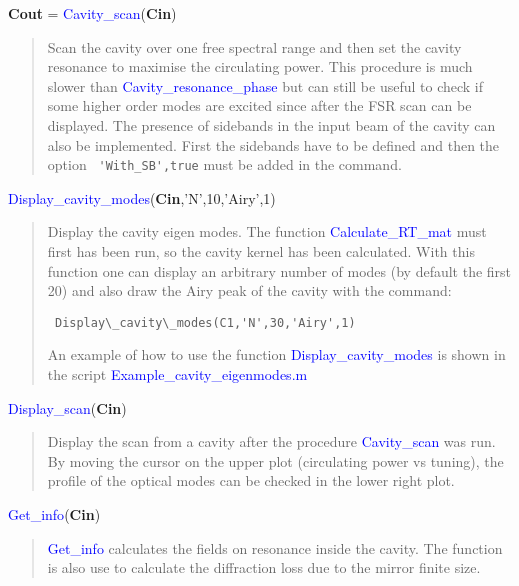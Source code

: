\noindent \textbf{Cout} = \textcolor{blue}{Cavity\_scan}(\textbf{Cin})
\vspace*{-0.2cm}
\begin{quote}
Scan the cavity over one free spectral range and then set the cavity resonance to maximise the circulating power. This procedure is much slower than \textcolor{blue}{Cavity\_resonance\_phase} but can still be useful to check if some higher order modes are excited since after the FSR scan can be displayed.
The presence of sidebands in the input beam of the cavity can also be implemented. First the sidebands have to be defined and then the option \verb? 'With_SB',true? must be added in the command.
\end{quote}

\noindent \textcolor{blue}{Display\_cavity\_modes}(\textbf{Cin},'N',10,'Airy',1)
\vspace*{-0.2cm}
\begin{quote}
Display the cavity eigen modes. The function \textcolor{blue}{Calculate\_RT\_mat} must first has been run, so the cavity kernel has been calculated. With this function one can display an arbitrary number of modes (by default the first 20) and also draw the Airy peak of the cavity with the command:

  \verb? Display\_cavity\_modes(C1,'N',30,'Airy',1) ?

An example of how to use the function \textcolor{blue}{Display\_cavity\_modes} is shown in the script \textcolor{blue}{Example\_cavity\_eigenmodes.m}
\end{quote}

\noindent \textcolor{blue}{Display\_scan}(\textbf{Cin})
\vspace*{-0.2cm}
\begin{quote}
Display the scan from a cavity after the procedure \textcolor{blue}{Cavity\_scan} was run. By moving the cursor on the upper plot (circulating power vs tuning), the profile of the optical modes can be checked in the lower right plot.
\end{quote}

\noindent \textcolor{blue}{Get\_info}(\textbf{Cin})
\vspace*{-0.2cm}
\begin{quote}
\textcolor{blue}{Get\_info} calculates the fields on resonance inside the cavity. The function is also use to calculate the diffraction loss due to the mirror finite size.
\end{quote}



